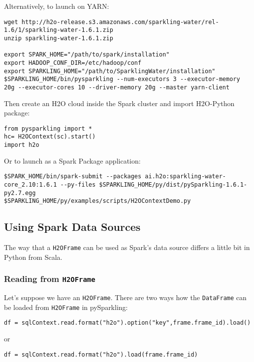 Alternatively, to launch on YARN:

\begin{lstlisting}[style=Bash]
wget http://h2o-release.s3.amazonaws.com/sparkling-water/rel-1.6/1/sparkling-water-1.6.1.zip
unzip sparkling-water-1.6.1.zip
 
export SPARK_HOME="/path/to/spark/installation"
export HADOOP_CONF_DIR=/etc/hadoop/conf
export SPARKLING_HOME="/path/to/SparklingWater/installation"
$SPARKLING_HOME/bin/pysparkling --num-executors 3 --executor-memory 20g --executor-cores 10 --driver-memory 20g --master yarn-client
\end{lstlisting}
    
Then create an H2O cloud inside the Spark cluster and import H2O-Python package:
\begin{lstlisting}[style=Scala]
from pysparkling import *
hc= H2OContext(sc).start()
import h2o
\end{lstlisting}

Or to launch as a Spark Package application:
\begin{lstlisting}[style=Bash]
$SPARK_HOME/bin/spark-submit --packages ai.h2o:sparkling-water-core_2.10:1.6.1 --py-files $SPARKLING_HOME/py/dist/pySparkling-1.6.1-py2.7.egg
$SPARKLING_HOME/py/examples/scripts/H2OContextDemo.py 
\end{lstlisting}


\subsection{Using Spark Data Sources}

The way that a \texttt{H2OFrame} can be used as Spark's data source differs a little bit in Python from Scala.

\subsubsection{Reading from \texttt{H2OFrame}}

Let's suppose we have an \texttt{H2OFrame}. There are two ways how the \texttt{DataFrame} can be loaded from \texttt{H2OFrame} in pySparkling:
\begin{lstlisting}[style=Scala]
df = sqlContext.read.format("h2o").option("key",frame.frame_id).load()
\end{lstlisting}
or
\begin{lstlisting}[style=Scala]
df = sqlContext.read.format("h2o").load(frame.frame_id)
\end{lstlisting}

